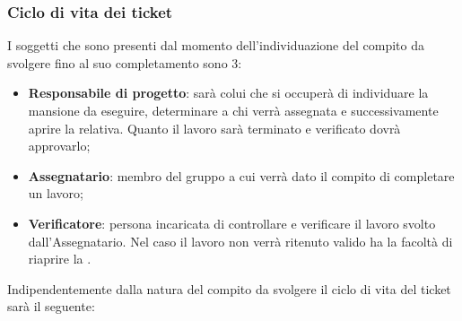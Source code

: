        \subsubsection{Ciclo di vita dei ticket}
            I soggetti che sono presenti dal momento dell’individuazione del compito da svolgere fino al suo completamento sono 3:
            \begin{itemize}
                \item\textbf{Responsabile di progetto}: sarà colui che si occuperà di individuare la mansione da eseguire, determinare a chi verrà assegnata e successivamente aprire la  relativa. Quanto il lavoro sarà terminato e verificato dovrà approvarlo;
                \item\textbf{Assegnatario}: membro del gruppo a cui verrà dato il compito di completare un lavoro;
                \item\textbf{Verificatore}: persona incaricata di controllare e verificare il lavoro svolto dall'Assegnatario. Nel caso il lavoro non verrà ritenuto valido ha la facoltà di riaprire la .
            \end{itemize}
            Indipendentemente dalla natura del compito da svolgere il ciclo di vita del ticket sarà il seguente:
